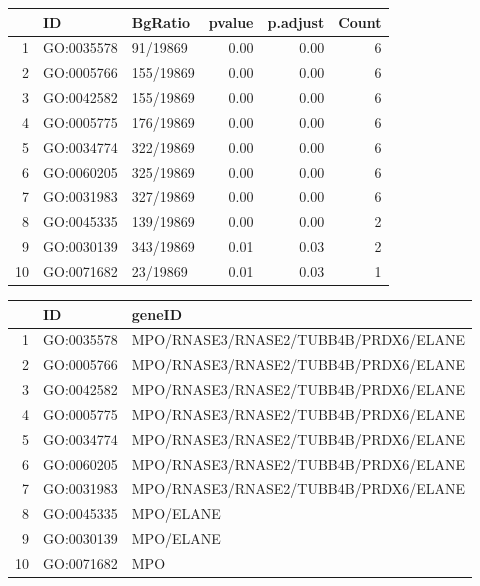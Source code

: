 \begin{table}[ht]
\centering
\begin{tabular}{rllrrr}
  \hline
 & ID & BgRatio & pvalue & p.adjust & Count \\ 
  \hline
1 & GO:0035578 & 91/19869 & 0.00 & 0.00 &   6 \\ 
  2 & GO:0005766 & 155/19869 & 0.00 & 0.00 &   6 \\ 
  3 & GO:0042582 & 155/19869 & 0.00 & 0.00 &   6 \\ 
  4 & GO:0005775 & 176/19869 & 0.00 & 0.00 &   6 \\ 
  5 & GO:0034774 & 322/19869 & 0.00 & 0.00 &   6 \\ 
  6 & GO:0060205 & 325/19869 & 0.00 & 0.00 &   6 \\ 
  7 & GO:0031983 & 327/19869 & 0.00 & 0.00 &   6 \\ 
  8 & GO:0045335 & 139/19869 & 0.00 & 0.00 &   2 \\ 
  9 & GO:0030139 & 343/19869 & 0.01 & 0.03 &   2 \\ 
  10 & GO:0071682 & 23/19869 & 0.01 & 0.03 &   1 \\ 
   \hline
\end{tabular}
\end{table}

\begin{table}[ht]
\centering
\begin{tabular}{rll}
  \hline
 & ID & geneID \\ 
  \hline
1 & GO:0035578 & MPO/RNASE3/RNASE2/TUBB4B/PRDX6/ELANE \\ 
  2 & GO:0005766 & MPO/RNASE3/RNASE2/TUBB4B/PRDX6/ELANE \\ 
  3 & GO:0042582 & MPO/RNASE3/RNASE2/TUBB4B/PRDX6/ELANE \\ 
  4 & GO:0005775 & MPO/RNASE3/RNASE2/TUBB4B/PRDX6/ELANE \\ 
  5 & GO:0034774 & MPO/RNASE3/RNASE2/TUBB4B/PRDX6/ELANE \\ 
  6 & GO:0060205 & MPO/RNASE3/RNASE2/TUBB4B/PRDX6/ELANE \\ 
  7 & GO:0031983 & MPO/RNASE3/RNASE2/TUBB4B/PRDX6/ELANE \\ 
  8 & GO:0045335 & MPO/ELANE \\ 
  9 & GO:0030139 & MPO/ELANE \\ 
  10 & GO:0071682 & MPO \\
   \hline
\end{tabular}
\end{table}

\newpage

